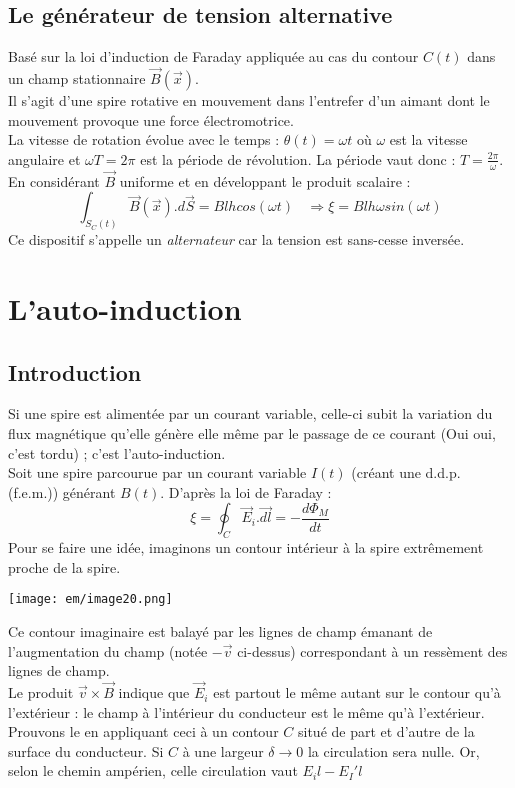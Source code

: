 \documentclass[british,french,11pt, a4paper, openany]{book}
\begin{document}
\subsection{Le générateur de tension alternative}
Basé sur la loi d'induction de Faraday appliquée au cas du contour $C(t)$ dans un champ stationnaire $\vec{B}(\vec{x})$.\\
Il s'agit d'une spire rotative en mouvement dans l'entrefer d'un aimant dont le mouvement provoque une force électromotrice.\\
La vitesse de rotation évolue avec le temps : $\theta (t) = \omega t$ où $\omega$ est la vitesse angulaire et $\omega T = 2\pi$ est la période de révolution. La période vaut donc : $T = \frac{2\pi}{\omega}$. En considérant $\vec{B}$ uniforme et en développant le produit scalaire : 
\begin{equation}
	\int_{S_C(t)} \vec{B}(\vec{x}).d\vec{S} = Blhcos(\omega t)\ \ \ \ \Rightarrow \xi = Blh\omega sin(\omega t)
\end{equation}
Ce dispositif s'appelle un \textit{alternateur} car la tension est sans-cesse inversée.

\section{L'auto-induction}
\subsection{Introduction}
Si  une spire est alimentée par un courant variable, celle-ci subit la variation du flux magnétique qu'elle génère elle même par le passage de ce courant (Oui oui, c'est tordu) ; c'est l'auto-induction.\\

Soit une spire parcourue par un courant variable $I(t)$ (créant une d.d.p. (f.e.m.)) générant $B(t)$. D'après la loi de Faraday : 
\begin{equation}
	\xi = \oint_C \vec{E}_i.\vec{dl} = -\frac{d\Phi_M}{dt}
\end{equation}
Pour se faire une idée, imaginons un contour intérieur à la spire extrêmement proche de la spire.

\begin{center}
	\texttt{[image: em/image20.png]}\\
\end{center}

Ce contour imaginaire est balayé par les lignes de champ émanant de l'augmentation du champ (notée $-\vec{v}$ ci-dessus) correspondant à un ressèment des lignes de champ.\\
Le produit $\vec{v} \times \vec{B}$ indique que $\vec{E}_i$ est partout le même autant sur le contour qu'à l'extérieur : le champ à l'intérieur du conducteur est le même qu'à l'extérieur.\\
Prouvons le en appliquant ceci à un contour $C$ situé de part et d'autre de la surface du conducteur. Si $C$ à une largeur $\delta \rightarrow 0$ la circulation sera nulle. Or, selon le chemin ampérien, celle circulation vaut $E_il - E_I'l$
\end{document}
